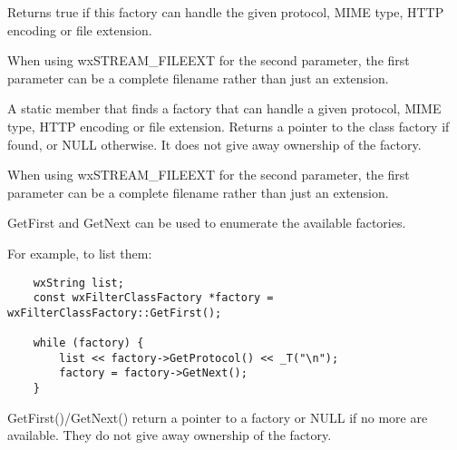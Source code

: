 

\label{wxfilterclassfactorycanhandle}


Returns true if this factory can handle the given protocol, MIME type, HTTP
encoding or file extension.

When using wxSTREAM\_FILEEXT for the second parameter, the first parameter
can be a complete filename rather than just an extension.


\label{wxfilterclassfactoryfind}


A static member that finds a factory that can handle a given protocol, MIME
type, HTTP encoding or file extension.  Returns a pointer to the class
factory if found, or NULL otherwise. It does not give away ownership of the
factory.

When using wxSTREAM\_FILEEXT for the second parameter, the first parameter
can be a complete filename rather than just an extension.


\label{wxfilterclassfactorygetfirst}



GetFirst and GetNext can be used to enumerate the available factories.

For example, to list them:

\begin{verbatim}
    wxString list;
    const wxFilterClassFactory *factory = wxFilterClassFactory::GetFirst();

    while (factory) {
        list << factory->GetProtocol() << _T("\n");
        factory = factory->GetNext();
    }

\end{verbatim}

GetFirst()/GetNext() return a pointer to a factory or NULL if no more
are available. They do not give away ownership of the factory.


\label{wxfilterclassfactorygetprotocol}

